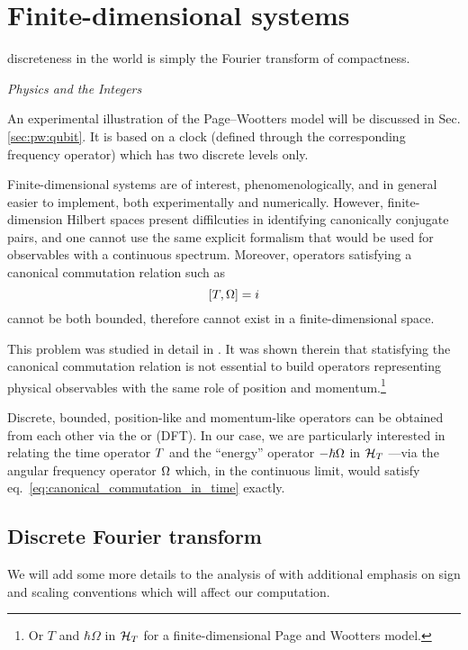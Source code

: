 \section{Finite-dimensional systems}\label{sec:finite-quantum}\label{sec:pw:theory_last}
\epigraph{\textelp{} discreteness in the world is simply the Fourier transform of compactness.}{%
  \emph{Physics and the Integers} \parencite{Tong_Integers}%
}

\noindent
An experimental illustration of the Page--Wootters model will be discussed in Sec. \ref{sec:pw:qubit}.
It is based on a clock
(defined through the corresponding frequency operator)
which has two discrete levels only.

Finite-dimensional systems are of interest, phenomenologically,
and in general easier to implement,
both experimentally and numerically.
However,
finite-dimension Hilbert spaces
present diffilcuties in identifying canonically conjugate
pairs, and one cannot use the same explicit formalism
that would be used for observables with a continuous spectrum.
Moreover, operators satisfying a canonical
commutation relation such as
\begin{equation}\label{eq:canonical_commutation_in_time}
  [{T}, {\Omega}] = i
\end{equation}
cannot be both bounded, therefore cannot exist in a finite-dimensional space.

This problem was studied in detail in
\cite{FiniteHilb}. It was shown therein
that statisfying the canonical commutation relation 
is not essential to build operators representing physical observables
with the same role of position and momentum.\footnote{
  Or $T$ and $\hbar\Omega$
  in $\mathcal{H}_T$ for a finite-dimensional Page and Wootters model.
}

Discrete, bounded, position-like and momentum-like operators can be obtained from
each other via
the  or   (DFT).
In our case, we are particularly interested in relating the
time operator ${T}$ and the ``energy'' operator $-\hbar{\Omega}$
in $\mathcal{H}_T$ ---via the angular frequency operator ${\Omega}$ which, in the continuous limit, would satisfy
eq.~\eqref{eq:canonical_commutation_in_time} exactly.

\subsection{Discrete Fourier transform}

We will add some more details to the analysis of \citereset\cite{FiniteHilb} with
additional emphasis on sign and scaling conventions which will affect
our computation.

